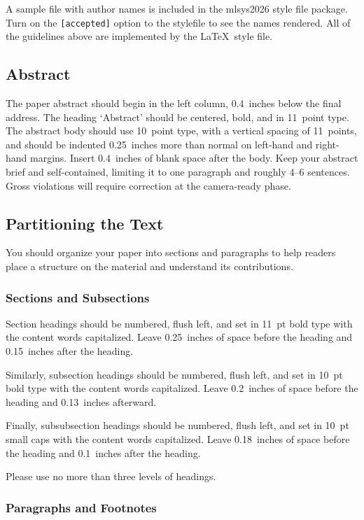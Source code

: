 \documentclass{article}
\begin{document}
A sample file with author names is included in the mlsys2026 style file
package. Turn on the \texttt{[accepted]} option to the stylefile to
see the names rendered. All of the guidelines above are implemented
by the \LaTeX\ style file.

\subsection{Abstract}

The paper abstract should begin in the left column, 0.4~inches below the final
address. The heading `Abstract' should be centered, bold, and in 11~point type.
The abstract body should use 10~point type, with a vertical spacing of
11~points, and should be indented 0.25~inches more than normal on left-hand and
right-hand margins. Insert 0.4~inches of blank space after the body. Keep your
abstract brief and self-contained, limiting it to one paragraph and roughly 4--6
sentences. Gross violations will require correction at the camera-ready phase.

\subsection{Partitioning the Text}

You should organize your paper into sections and paragraphs to help
readers place a structure on the material and understand its
contributions.

\subsubsection{Sections and Subsections}

Section headings should be numbered, flush left, and set in 11~pt bold
type with the content words capitalized. Leave 0.25~inches of space
before the heading and 0.15~inches after the heading.

Similarly, subsection headings should be numbered, flush left, and set
in 10~pt bold type with the content words capitalized. Leave
0.2~inches of space before the heading and 0.13~inches afterward.

Finally, subsubsection headings should be numbered, flush left, and
set in 10~pt small caps with the content words capitalized. Leave
0.18~inches of space before the heading and 0.1~inches after the
heading.

Please use no more than three levels of headings.

\subsubsection{Paragraphs and Footnotes}
\end{document}
